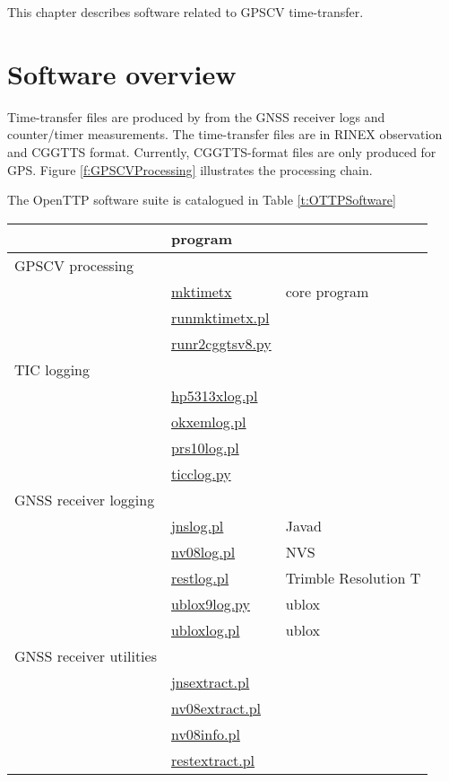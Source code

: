 
This chapter describes software related to GPSCV time-transfer.


\section{Software overview}

Time-transfer files are produced by  from the GNSS receiver logs and counter/timer measurements.
The time-transfer files are in  RINEX observation  and CGGTTS format. 
Currently, CGGTTS-format files are only produced for GPS. 
Figure \ref{f:GPSCVProcessing} illustrates the processing chain. 

The OpenTTP software suite is catalogued in Table \ref{t:OTTPSoftware}
\begin{table}[h]
\begin{tabular}{l|l|l}
	& program & \\ 
	\hline
GPSCV processing  &  & \\
	& \hyperlink{h:mktimetx}{mktimetx} & core program\\
	& \hyperlink{h:runmktimetx}{runmktimetx.pl} & \\
	& \hyperlink{h:runr2cggttsv8}{runr2cggtsv8.py} & \\
	\hline
TIC logging & & \\
	& \hyperlink{h:hp5313xlog}{hp5313xlog.pl} &\\
	& \hyperlink{h:okxemlog}{okxemlog.pl} & \\
	& \hyperlink{h:prs10log}{prs10log.pl} & \\
	& \hyperlink{h:ticclog}{ticclog.py} & \\
	\hline
GNSS receiver logging & & \\
	&	\hyperlink{h:jnslog}{jnslog.pl} & Javad\\
	& \hyperlink{h:nvslog}{nv08log.pl} & NVS\\
	& \hyperlink{h:restlog}{restlog.pl} & Trimble Resolution T\\
	& \hyperlink{h:ublox9log}{ublox9log.py} & ublox\\
	& \hyperlink{h:ubloxlog}{ubloxlog.pl} & ublox\\
GNSS receiver utilities & & \\
	& \hyperlink{h:jnsextract}{jnsextract.pl} & \\
	& \hyperlink{h:nv08extract}{nv08extract.pl} & \\
	& \hyperlink{h:nv08info}{nv08info.pl} & \\
	& \hyperlink{h:restextract}{restextract.pl} & \\

\end{tabular}
\end{table}
